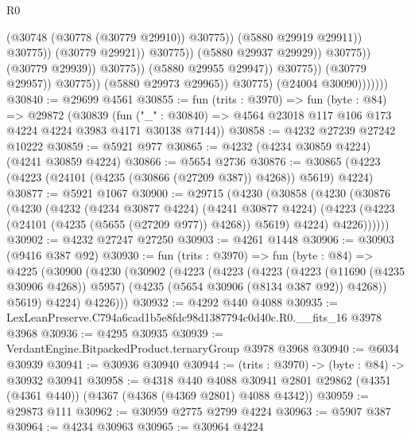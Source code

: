 \begin{lexlean}{R0}
\begin{coremodule}
                                                          (@30748 (@30778 (@30779 @29910)) @30775))
                                                        (@5880 @29919 @29911))
                                                      @30775))
                                                  (@30779 @29921))
                                                @30775))
                                            (@5880 @29937 @29929))
                                          @30775))
                                      (@30779 @29939))
                                    @30775))
                                (@5880 @29955 @29947))
                              @30775))
                          (@30779 @29957))
                        @30775))
                    (@5880 @29973 @29965))
                  @30775)
                (@24004 @30090)))))))
@30840 := @29699 @4561
@30855 := fun (trits : @3970) =>
  fun (byte : @84) =>
  @29872
    (@30839
      (fun ("_" : @30840) => @4564 @23018 @117 @106 @173 @4224 @4224 @3983 @4171 @30138 @7144))
@30858 := @4232 @27239 @27242 @10222
@30859 := @5921 @977
@30865 := @4232 (@4234 @30859 @4224) (@4241 @30859 @4224)
@30866 := @5654 @2736
@30876 := @30865 (@4223 (@4223 (@24101 (@4235 (@30866 (@27209 @387)) @4268)) @5619) @4224)
@30877 := @5921 @1067
@30900 := @29715
    (@4230
      (@30858
        (@4230
          (@30876
            (@4230
              (@4232
                (@4234 @30877 @4224)
                (@4241 @30877 @4224)
                (@4223 (@4223 (@24101 (@4235 (@5655 (@27209 @977)) @4268)) @5619) @4224)
                @4226))))))
@30902 := @4232 @27247 @27250
@30903 := @4261 @1448
@30906 := @30903 (@9416 @387 @92)
@30930 := fun (trits : @3970) =>
  fun (byte : @84) =>
  @4225
    (@30900
      (@4230
        (@30902
          (@4223
            (@4223
              (@4223
                (@4223 (@11690 (@4235 @30906 @4268)) @5957)
                (@4235 (@5654 @30906 (@8134 @387 @92)) @4268))
              @5619)
            @4224)
          @4226)))
@30932 := @4292 @440 @4088
@30935 := LexLeanPreserve.C794a6cad1b5e8fdc98d1387794c0d40c.R0.__fits_16 @3978 @3968
@30936 := @4295 @30935
@30939 := VerdantEngine.BitpackedProduct.ternaryGroup @3978 @3968
@30940 := @6034 @30939
@30941 := @30936 @30940
@30944 := (trits : @3970) -> (byte : @84) -> @30932 @30941
@30958 := @4318
    @440
    @4088
    @30941
    @2801
    @29862
    (@4351 (@4361 @440))
    (@4367 (@4368 (@4369 @2801) @4088 @4342))
@30959 := @29873 @111
@30962 := @30959 @2775 @2799 @4224
@30963 := @5907 @387
@30964 := @4234 @30963
@30965 := @30964 @4224

\end{coremodule}
\end{lexlean}
